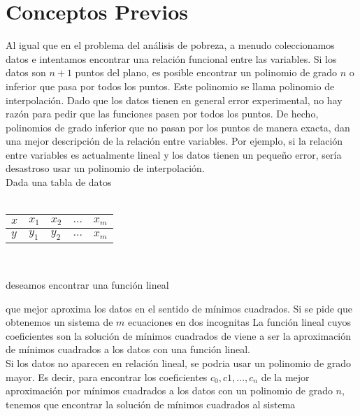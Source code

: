 \documentclass[twocolumn,twoside]{article}
\begin{document}
\section{Conceptos Previos}
Al igual que en el problema del an\'alisis de pobreza, a menudo coleccionamos datos e 
intentamos encontrar una relación funcional entre las variables. Si los datos son $n+1$ 
puntos del plano, es posible encontrar un polinomio de grado $n$ o inferior que pasa por 
todos los puntos. Este polinomio se llama polinomio de interpolación.
Dado que los datos tienen en general error experimental,
no hay razón para pedir que las funciones pasen por todos los puntos. De hecho, polinomios
de grado inferior que no pasan por los puntos de manera exacta, dan una mejor
descripción de la relación entre variables. Por ejemplo, si la relación entre variables es
actualmente lineal y los datos tienen un pequeño error, ser\'ia desastroso usar un polinomio
de interpolación.\\
Dada una tabla de datos \\
  \
  \
    \begin{table}[!htb]
    \begin{center}
        
    
    \begin{tabular}{|l|l|l|l|l|}
    \hline
    
    $x$&   $x_{1}$&   $x_{2}$&   $...$&  $x_{m}$ \\ \hline
    $y$&   $y_{1}$&   $y_{2}$&   $...$&  $x_{m}$ \\ 
    \hline 
    \end{tabular}
    
    \end{center}
    \end{table} 
\
\
\

deseamos encontrar una función lineal


que mejor aproxima los datos en el sentido de m\'inimos cuadrados. Si se pide que
obtenemos un sistema de $m$ ecuaciones en dos incognitas
La función lineal cuyos coeficientes son la solución de m\'inimos cuadrados de %
viene a ser la aproximación de m\'inimos cuadrados a los datos con una funci\'on lineal. \\
Si los datos no aparecen en relación lineal, se podria usar un polinomio de grado
mayor. Es decir, para encontrar los coeficientes $c_{0}, c{1}, . . ., c_{n}$ de la mejor aproximación
por m\'inimos cuadrados a los datos 
con un polinomio de grado $n$, tenemos que encontrar la solución de m\'inimos cuadrados
al sistema
\end{document}
